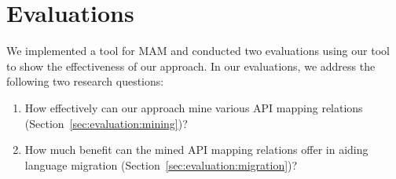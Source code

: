 \section{Evaluations}
\label{sec:evaluation}

We implemented a tool for MAM and
conducted two evaluations using our tool to show the effectiveness
of our approach. In our evaluations, we address the following
two research questions:

\vspace*{-1.5ex}
\begin{enumerate}
\item How effectively can our approach mine various API mapping relations
(Section~\ref{sec:evaluation:mining})? \vspace*{-1.8ex}
\item How much benefit can the mined API mapping relations offer in aiding language
migration (Section~\ref{sec:evaluation:migration})?\vspace*{-1.6ex}

\end{enumerate}%


